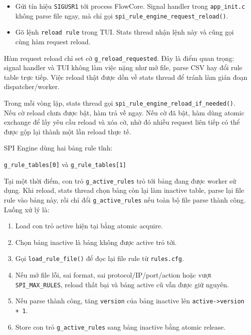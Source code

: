 \documentclass[12pt,a4paper]{report}
\DeclareRobustCommand{\code}[1]{{\small\texttt{#1}}}
\begin{document}
\begin{itemize}
    \item Gửi tín hiệu \code{SIGUSR1} tới process FlowCore. Signal handler trong \code{app\_init.c} không parse file ngay, mà chỉ gọi \code{spi\_rule\_engine\_request\_reload()}.
    \item Gõ lệnh \code{reload rule} trong TUI. Stats thread nhận lệnh này và cũng gọi cùng hàm request reload.
\end{itemize}

Hàm request reload chỉ set cờ \code{g\_reload\_requested}. Đây là điểm quan trọng: signal handler và TUI không làm việc nặng như mở file, parse CSV hay đổi rule table trực tiếp. Việc reload thật được dồn về stats thread để tránh làm gián đoạn dispatcher/worker.

Trong mỗi vòng lặp, stats thread gọi \code{spi\_rule\_engine\_reload\_if\_needed()}. Nếu cờ reload chưa được bật, hàm trả về ngay. Nếu cờ đã bật, hàm dùng atomic exchange để lấy yêu cầu reload và xóa cờ, nhờ đó nhiều request liên tiếp có thể được gộp lại thành một lần reload thực tế.

SPI Engine dùng hai bảng rule tĩnh:

\begin{center}
\code{g\_rule\_tables[0]} và \code{g\_rule\_tables[1]}
\end{center}

Tại một thời điểm, con trỏ \code{g\_active\_rules} trỏ tới bảng đang được worker sử dụng. Khi reload, stats thread chọn bảng còn lại làm inactive table, parse lại file rule vào bảng này, rồi chỉ đổi \code{g\_active\_rules} nếu toàn bộ file parse thành công. Luồng xử lý là:

\begin{enumerate}
    \item Load con trỏ active hiện tại bằng atomic acquire.
    \item Chọn bảng inactive là bảng không được active trỏ tới.
    \item Gọi \code{load\_rule\_file()} để đọc lại file rule từ \code{rules.cfg}.
    \item Nếu mở file lỗi, sai format, sai protocol/IP/port/action hoặc vượt \code{SPI\_MAX\_RULES}, reload thất bại và bảng active cũ vẫn được giữ nguyên.
    \item Nếu parse thành công, tăng \code{version} của bảng inactive lên \code{active->version + 1}.
    \item Store con trỏ \code{g\_active\_rules} sang bảng inactive bằng atomic release.
\end{enumerate}
\end{document}
